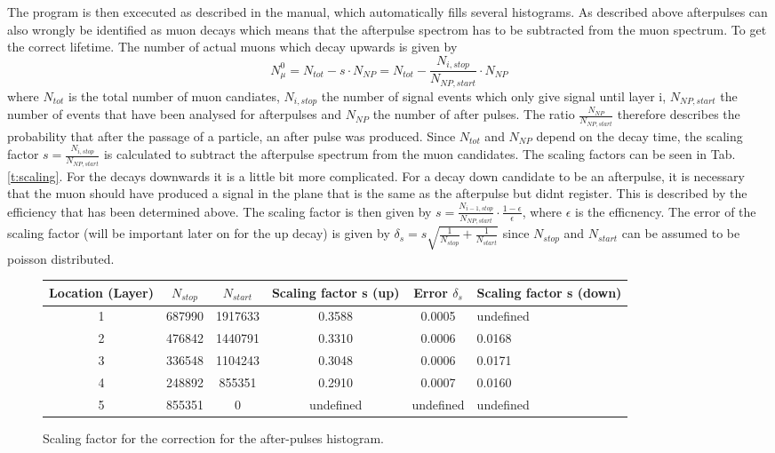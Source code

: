 The program is then excecuted as described in the manual, which automatically fills several histograms. As described above afterpulses can also wrongly be identified as muon decays which means that the afterpulse spectrom has to be subtracted from the muon spectrum. To get the correct lifetime. 
The number of actual muons which decay upwards is given by
\begin{equation}
	N_\mu^0=N_{tot}-s\cdot N_{NP} = N_{tot} - \frac{N_{i,stop}}{N_{NP,start}}\cdot N_{NP}
\end{equation}
where $N_{tot}$ is the total number of muon candiates, $N_{i,stop}$ the number of signal events which only give signal until layer i, $N_{NP,start}$ the number of events that have been analysed for afterpulses and $N_{NP}$ the number of after pulses. The ratio $\frac{N_{NP}}{N_{NP,start}}$ therefore describes the probability that after the passage of a particle, an after pulse was produced. Since $N_{tot}$ and $N_{NP}$ depend on the decay time, the scaling factor $s = \frac{N_{i,stop}}{N_{NP,start}}$ is calculated to subtract the afterpulse spectrum from the muon candidates. The scaling factors can be seen in Tab.\,\ref{t:scaling}. For the decays downwards it is a little bit more complicated. For a decay down candidate to be an afterpulse, it is necessary that the muon should have produced a signal in the plane that is the same as the afterpulse but didnt register. This is described by the efficiency that has been determined above. The scaling factor is then given by $s = \frac{N_{i-1,stop}}{N_{NP,start}}\cdot\frac{1-\epsilon}{\epsilon}$, where $\epsilon$ is the efficnency. The error of the scaling factor (will be important later on for the up decay) is given by $\delta_s = s\sqrt{\frac{1}{N_{stop}}+\frac{1}{N_{start}}}$ since $N_{stop}$ and $N_{start}$ can be assumed to be poisson distributed. 
 
\begin{figure}
\begin{tabularx}{\textwidth}{| c | c | c | c | c |}
Location (Layer) & $N_{stop}$ & $N_{start}$ & Scaling factor s (up) & Error $\delta_s $ & Scaling factor s (down) \\
 & 687990 & 1917633 & 0.3588 & 0.0005 & undefined\\
2 & 476842 & 1440791 & 0.3310 & 0.0006 & 0.0168\\
3 & 336548 & 1104243 & 0.3048 & 0.0006 & 0.0171\\
4 & 248892 & 855351 & 0.2910 & 0.0007 & 0.0160\\
5 & 855351 & 0 & undefined & undefined & undefined
\end{tabularx}
\caption{Scaling factor for the correction for the after-pulses histogram.}
\end{figure}

